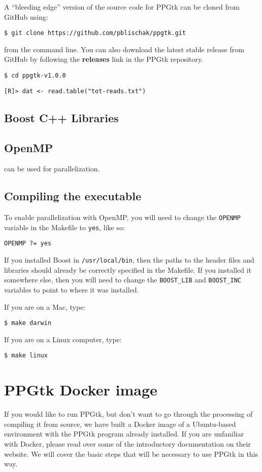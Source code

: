 \documentclass[11pt,english,letterpaper,oneside]{article}
\newcommand{\ppgtk}{PPGtk}
\newcommand{\code}[1]{\hspace{5pt} \texttt{\$ #1}}
\newcommand{\rcode}[1]{\hspace{5pt} \texttt{[R]> #1}}
\newcommand{\makefile}[1]{\hspace{5pt} \texttt{#1}}
\begin{document}
A ``bleeding edge'' version of the source code for \ppgtk{} can be cloned from GitHub using:

\code{git clone https://github.com/pblischak/ppgtk.git}

from the command line. You can also download the latest stable release from GitHub by following the \textbf{releases} link in the \ppgtk{} repository.

\code{cd ppgtk-v1.0.0}

\rcode{dat <- read.table("tot-reads.txt")}

\subsection{Boost C++ Libraries}


\subsection{OpenMP}

can be used for parallelization.

\subsection{Compiling the executable}

To enable parallelization with OpenMP, you will need to change the \texttt{OPENMP} variable in the Makefile to \texttt{yes}, like so:

\makefile{OPENMP ?= yes}

If you installed Boost in \texttt{/usr/local/bin}, then the paths to the header files and libraries should already be correctly specified in the Makefile. If you installed it somewhere else, then you will need to change the \texttt{BOOST\_LIB} and \texttt{BOOST\_INC} variables to point to where it was installed.

If you are on a Mac, type:

\code{make darwin}

If you are on a Linux computer, type:

\code{make linux}

\section{PPGtk Docker image}

If you would like to run PPGtk, but don't want to go through the processing of compiling it from source, we have built a Docker image of a Ubuntu-based environment with the PPGtk program already installed. If you are unfaniliar with Docker, please read over some of the introductory documentation on their website. We will cover the basic steps that will be necessary to use PPGtk in this way.
\end{document}
